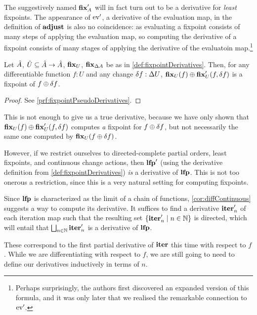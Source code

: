 The suggestively named $\mathbf{fix}_A'$ will in fact turn out to be a
derivative \textemdash{} for \emph{least} fixpoints. The appearance of
$\operatorname{ev}'$, a derivative of the evaluation map, in the definition of
$\mathbf{adjust}$ is also no coincidence: as evaluating a fixpoint consists of many
steps of applying the evaluation map, so computing the derivative of a fixpoint
consists of many stages of applying the derivative of the evaluatoin
map.\footnote{Perhaps surprisingly, the authors first discovered an expanded
  version of this formula, and it was only later that we realised the remarkable
  connection to $\operatorname{ev}'$.}

\begin{thm}[name=Pseudo-derivatives of fixpoints, restate=fixpointPseudoDerivatives]
\label{thm:fixpointPseudoDerivatives}
  Let $\hat{A}$, $\hat{U} \subseteq \hat{A} \rightarrow \hat{A}$, $\mathbf{fix}_{U}$,
  $\mathbf{fix}_{\Delta A}$ be as in \cref{def:fixpointDerivatives}. Then, for any
  differentiable function $f : U$ and any change $\delta f : \Delta U$,
  $\mathbf{fix}_U(f) \oplus \mathbf{fix}_U'(f, \delta f)$ is a fixpoint
  of $f \oplus \delta f$.
\end{thm}
\ifproofs
\begin{proof}
  See \cref{prf:fixpointPseudoDerivatives}.
\end{proof}
\fi

This is not enough to give us a true derivative, because we have only shown
that $\mathbf{fix}_U(f) \oplus \mathbf{fix}_U'(f, \delta f)$ computes \emph{a} 
fixpoint for $f \oplus \delta f$, but not necessarily
the same one computed by $\mathbf{fix}_U{(f \oplus \delta f)}$.

However, if we restrict ourselves to directed-complete partial orders, least
fixpoints, and continuous change actions, then $\mathbf{lfp}'$ (using the
derivative definition from \cref{def:fixpointDerivatives}) \emph{is} a
derivative of $\mathbf{lfp}$. This is not too onerous a restriction, since this is
a very natural setting for computing fixpoints.

Since $\mathbf{lfp}$ is characterized as the limit of a chain of functions,
\cref{cor:diffContinuous} suggests a way to compute its derivative. It suffices to find a derivative
$\mathbf{iter}_n'$ of each iteration map 
such that the resulting set $\{ \mathbf{iter}_n' \mid n \in \mathbb{N}\}$ is directed, 
which will entail that $\bigsqcup_{n \in \mathbb{N}}\mathbf{iter}_n'$ is a derivative of $\mathbf{lfp}$.

These correspond to the first partial derivative of $\mathbf{iter}$ \textemdash{} this time with respect to
$f$. While we are differentiating with respect to $f$, we are still going to
need to define our derivatives inductively in terms of $n$.

